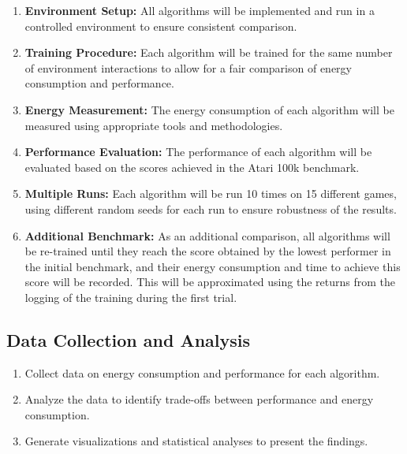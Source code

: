 \begin{enumerate}
	\item \textbf{Environment Setup:} All algorithms will be implemented and run in a controlled environment to ensure consistent comparison.
	\item \textbf{Training Procedure:} Each algorithm will be trained for the same number of environment interactions to allow for a fair comparison of energy consumption and performance.
	\item \textbf{Energy Measurement:} The energy consumption of each algorithm will be measured using appropriate tools and methodologies.
	\item \textbf{Performance Evaluation:} The performance of each algorithm will be evaluated based on the scores achieved in the Atari 100k benchmark.
	\item \textbf{Multiple Runs:} Each algorithm will be run 10 times on 15 different games, using different random seeds for each run to ensure robustness of the results.
	\item \textbf{Additional Benchmark:} As an additional comparison, all algorithms will be re-trained until they reach the score obtained by the lowest performer in the initial benchmark, and their energy consumption and time to achieve this score will be recorded. This will be approximated using the returns from the logging of the training during the first trial.
\end{enumerate}

\subsection{Data Collection and Analysis}
\label{subsec:data_collection}

\begin{enumerate}
	\item Collect data on energy consumption and performance for each algorithm.
	\item Analyze the data to identify trade-offs between performance and energy consumption.
	\item Generate visualizations and statistical analyses to present the findings.
\end{enumerate}
